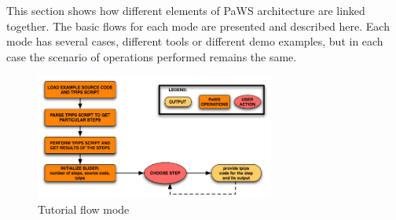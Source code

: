 This section shows how different elements of PaWS architecture are
linked together. The basic flows for each mode are presented and
described here. Each mode has several cases, different tools or
different demo examples, but in each case the scenario of operations
performed remains the same.

\begin{figure}[h!]
  \centering
  \includegraphics[width=0.7\textwidth]{reportCh2/tutorial_flow}
  \caption{Tutorial flow mode}
  \label{fig:tutorial_flow}
\end{figure}

